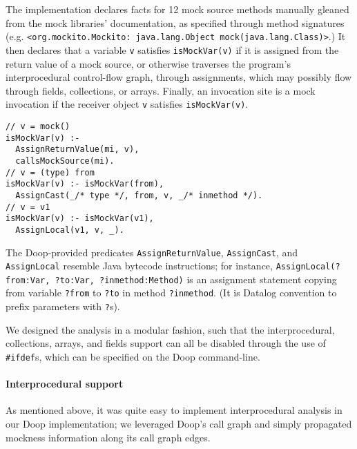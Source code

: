 

The implementation declares facts for 12 mock source methods manually gleaned from the mock libraries' documentation, as specified through method signatures (e.g. 
\texttt{<org.mockito.Mockito: java.lang.Object mock(java.lang.Class)>}.)
It then declares that a variable {\tt v} satisfies \verb+isMockVar(v)+ if it is assigned from the return value of a mock source, or otherwise traverses the program's interprocedural control-flow graph, through assignments, which may possibly flow through fields, collections, or arrays. Finally, an invocation site is a mock invocation if the receiver object {\tt v} satisfies \verb+isMockVar(v)+.

\begin{lstlisting}[basicstyle=\ttfamily\small,numbers=none,label={lst:core},caption={Selected rules for Datalog mock analysis},
basicstyle=\scriptsize\ttfamily, framesep=4.5mm, framexleftmargin=1.0mm, captionpos=b, label=lis:datalog-rule, escapechar=!]
// v = mock()
isMockVar(v) :-
  AssignReturnValue(mi, v),
  callsMockSource(mi).
// v = (type) from
isMockVar(v) :- isMockVar(from),
  AssignCast(_/* type */, from, v, _/* inmethod */).
// v = v1
isMockVar(v) :- isMockVar(v1),
  AssignLocal(v1, v, _).
\end{lstlisting}

The Doop-provided predicates \texttt{AssignReturnValue}, \texttt{AssignCast}, and \texttt{AssignLocal} resemble Java bytecode instructions; for instance, \texttt{AssignLocal(?from:Var, ?to:Var, ?inmethod:Method)} is an assignment statement copying from variable \texttt{?from} to \texttt{?to} in method \texttt{?inmethod}. (It is Datalog convention to prefix parameters with \texttt{?}s).

We designed the analysis in a modular fashion, such that the interprocedural, collections, arrays, and fields support can all be disabled through the use of \verb+#ifdef+s, which can be specified on the Doop command-line.

\paragraph{Interprocedural support}
As mentioned above, it was quite easy to implement interprocedural analysis in our Doop implementation; we leveraged Doop's call graph and simply propagated mockness information along its call graph edges.

